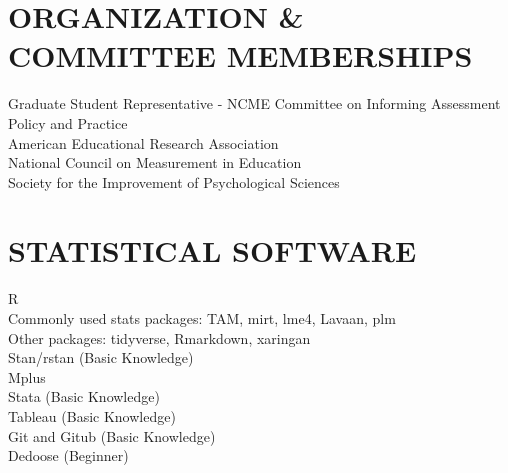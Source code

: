 \documentclass[12pt, oneside,]{memoir}
\begin{document}
\hypertarget{organization-committee-memberships}{%
\section{ORGANIZATION \& COMMITTEE
MEMBERSHIPS}\label{organization-committee-memberships}}

\noindent Graduate Student Representative - NCME Committee on Informing Assessment Policy and Practice\\
American Educational Research Association\\
National Council on Measurement in Education\\
Society for the Improvement of Psychological Sciences
\vspace{4mm}

\hypertarget{statistical-software}{%
\section{STATISTICAL SOFTWARE}\label{statistical-software}}
\noindent R\\
\hspace*{0.333em} Commonly used stats packages: TAM, mirt, lme4, Lavaan, plm\\
\hspace*{0.333em} Other packages: tidyverse, Rmarkdown, xaringan\\
\hspace*{0.333em}Stan/rstan (Basic Knowledge)\\
\noindent Mplus\\
\noindent Stata (Basic Knowledge)\\
Tableau (Basic Knowledge)\\
Git and Gitub (Basic Knowledge)\\
Dedoose (Beginner)
\end{document}
